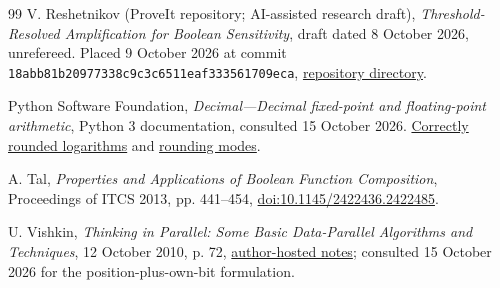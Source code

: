 \documentclass[11pt]{amsart}
\theoremstyle{definition}
\theoremstyle{remark}
\begin{document}
\begin{thebibliography}{99}
V. Reshetnikov (ProveIt repository; AI-assisted research draft),
\emph{Threshold-Resolved Amplification for Boolean Sensitivity}, draft dated
8 October 2026, unrefereed. Placed 9 October 2026 at commit
\texttt{18abb81b20977338c9c3c6511eaf333561709eca},
\href{https://github.com/VladimirReshetnikov/ProveIt/tree/18abb81b20977338c9c3c6511eaf333561709eca/Combinatorics/BooleanFunctions/Research/sensitivity-block-sensitivity}{repository directory}.

Python Software Foundation,
\emph{Decimal---Decimal fixed-point and floating-point arithmetic},
Python 3 documentation, consulted 15 October 2026.
\href{https://docs.python.org/3/library/decimal.html#decimal.Decimal.ln}{Correctly rounded logarithms}
and \href{https://docs.python.org/3/library/decimal.html#rounding-modes}{rounding modes}.

A. Tal,
\emph{Properties and Applications of Boolean Function Composition},
Proceedings of ITCS 2013, pp. 441--454,
\href{https://doi.org/10.1145/2422436.2422485}{doi:10.1145/2422436.2422485}.

U. Vishkin,
\emph{Thinking in Parallel: Some Basic Data-Parallel Algorithms and
Techniques}, 12 October 2010, p. 72,
\href{https://users.umiacs.umd.edu/~vishkin/PUBLICATIONS/classnotes.pdf}{author-hosted notes};
consulted 15 October 2026 for the position-plus-own-bit formulation.
\end{thebibliography}
\end{document}

